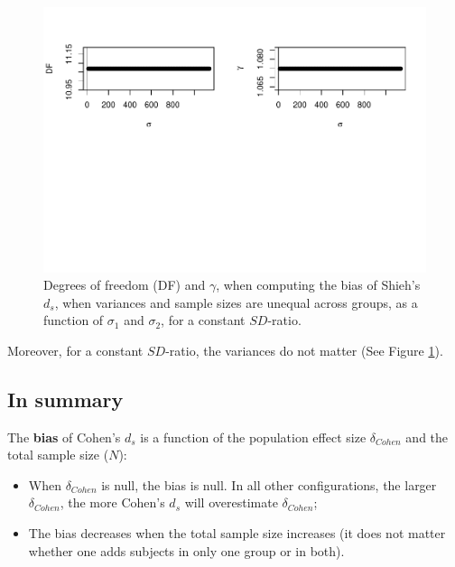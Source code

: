\documentclass[
  english,
  man]{apa6}
\providecommand{\tightlist}{%
  \setlength{\itemsep}{0pt}\setlength{\parskip}{0pt}}
\begin{document}
\begin{figure}
\centering
\includegraphics{Theoretical-Bias-of-all-estimators-as-a-function-of-population-parameters_files/figure-latex/biasshiehhetunbalvariance2-1.pdf}
\caption{\label{fig:biasshiehhetunbalvariance2}Degrees of freedom (DF) and \(\gamma\), when computing the bias of Shieh's \(d_s\), when variances and sample sizes are unequal across groups, as a function of \(\sigma_1\) and \(\sigma_2\), for a constant \(SD\)-ratio.}
\end{figure}

Moreover, for a constant \(SD\)-ratio, the variances do not matter (See Figure \ref{fig:biasshiehhetunbalvariance2}).

\hypertarget{in-summary}{%
\subsection{In summary}\label{in-summary}}

The \textbf{bias} of Cohen's \(d_s\) is a function of the population effect size \(\delta_{Cohen}\) and the total sample size (\(N\)):

\begin{itemize}
\tightlist
\item
  When \(\delta_{Cohen}\) is null, the bias is null. In all other configurations, the larger \(\delta_{Cohen}\), the more Cohen's \(d_s\) will overestimate \(\delta_{Cohen}\);\\
\item
  The bias decreases when the total sample size increases (it does not matter whether one adds subjects in only one group or in both).
\end{itemize}
\end{document}
